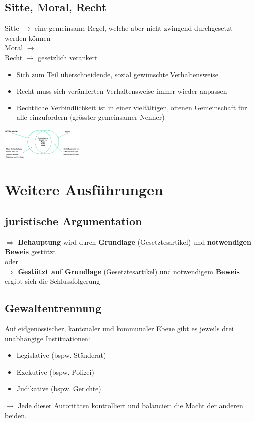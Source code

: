 \documentclass{report}
\newenvironment{Figure}
	{\par\medskip\noindent\minipage{\linewidth}}
	{\endminipage\par\medskip}
\theoremstyle{definition}
\theoremstyle{example}
\begin{document}
\subsection{Sitte, Moral, Recht}
Sitte $\rightarrow$ eine gemeinsame Regel, welche aber nicht zwingend durchgesetzt werden können\\
Moral $\rightarrow$ \\
Recht $\rightarrow$ gesetzlich verankert
\begin{itemize}
   \item Sich zum Teil überschneidende, sozial gewünschte Verhaltensweise
   \item Recht muss sich veränderten Verhaltensweise immer wieder anpassen
   \item Rechtliche Verbindlichkeit ist in einer vielfältigen, offenen Gemeinschaft für alle einzufordern (grösster gemeinsamer Nenner)
\end{itemize}
\begin{Figure}
   \centering
    \includegraphics[width=150px]{img/SitteMoralRecht.png}
        \label{fig:Sitte Moral Recht}
\end{Figure}

\section{Weitere Ausführungen}

\subsection{juristische Argumentation}
$\Rightarrow$ \textbf{Behauptung} wird durch \textbf{Grundlage} (Gesetztesartikel) und \textbf{notwendigen Beweis} gestützt \\
oder \\
$\Rightarrow$ \textbf{Gestützt auf Grundlage} (Gesetztesartikel) und notwendigem \textbf{Beweis} ergibt sich die Schlussfolgerung

\subsection{Gewaltentrennung}
Auf eidgenössischer, kantonaler und kommunaler Ebene gibt es jeweils drei unabhängige Instituationen:
\begin{itemize}
   \item Legislative (bspw. Ständerat)
   \item Exekutive (bspw. Polizei)
   \item Judikative (bspw. Gerichte)
\end{itemize}
$\rightarrow$ Jede dieser Autoritäten kontrolliert und balanciert die Macht der anderen beiden.
\end{document}
